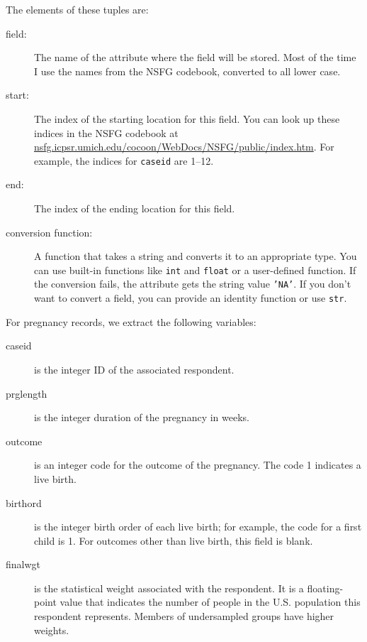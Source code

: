 \documentclass[10pt]{book}
\begin{document}
The elements of these tuples are:

\begin{description}

\item[field:] The name of the attribute where the field
will be stored.  Most of the time I use the names from the
NSFG codebook, converted to all lower case.

\item[start:] The index of the starting location for this
field.  You can look up these indices in the NSFG codebook
at \url{nsfg.icpsr.umich.edu/cocoon/WebDocs/NSFG/public/index.htm}.
For example, the indices for {\tt caseid} are
1--12.

\item[end:] The index of the ending location for this
field.

\item[conversion function:] A function that takes a string
and converts it to an appropriate type.  You can use built-in
functions like {\tt int} and {\tt float} or a user-defined
function.  If the conversion fails, the attribute gets the
string value {\tt 'NA'}.  If you don't want to convert a
field, you can provide an identity function or use {\tt str}.

\end{description}

For pregnancy records, we extract the following variables:

\begin{description}

\item[caseid] is the integer ID of the associated respondent.

\item[prglength] is the integer duration of the pregnancy in weeks.

\item[outcome] is an integer code for the outcome of the pregnancy.
The code 1 indicates a live birth.

\item[birthord] is the integer birth order of each live birth;
for example, the code for a first child is 1. 
For outcomes other than live birth, this field is blank.

\item[finalwgt] is the statistical weight associated with the respondent.
It is a floating-point value that indicates the number of people in
the U.S. population this respondent represents.  Members of undersampled
groups have higher weights.

\end{description}
\end{document}
